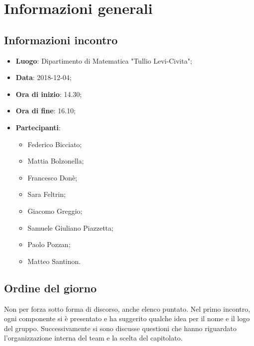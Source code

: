 \section{Informazioni generali}

\subsection{Informazioni incontro}
\begin{itemize}
\item \textbf{Luogo}: Dipartimento di Matematica "Tullio Levi-Civita";
\item \textbf{Data}: 2018-12-04;
\item \textbf{Ora di inizio}: 14.30;
\item \textbf{Ora di fine}: 16.10;
\item \textbf{Partecipanti}: 
\begin{itemize}
	\item Federico Bicciato;
	\item Mattia Bolzonella;
	\item Francesco Donè;
	\item Sara Feltrin;
	\item Giacomo Greggio;
	\item Samuele Giuliano Piazzetta;
	\item Paolo Pozzan;
	\item Matteo Santinon.
\end{itemize}
\end{itemize}

\subsection{Ordine del giorno}
Non per forza sotto forma di discorso, anche elenco puntato.
Nel primo incontro, ogni componente si è presentato e ha suggerito qualche idea 
per il nome e il logo del gruppo. Successivamente si sono discusse questioni 
che hanno riguardato l'organizzazione interna del team e la scelta del 
capitolato\glo{}.
